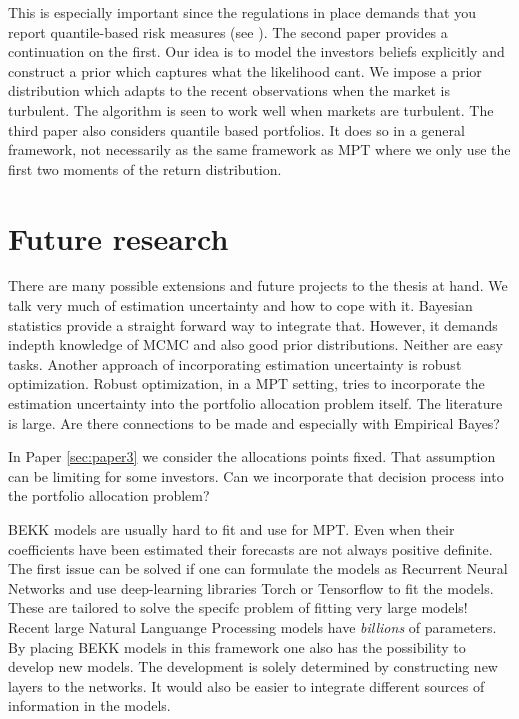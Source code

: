 \documentclass[oneside]{book}\usepackage{knitr}
\begin{document}
This is especially important since the regulations in place demands that you report quantile-based risk measures (see \citet{basel4}).
The second paper provides a continuation on the first. 
Our idea is to model the investors beliefs explicitly and construct a prior which captures what the likelihood cant. 
We impose a prior distribution which adapts to the recent observations when the market is turbulent. 
The algorithm is seen to work well when markets are turbulent.
The third paper also considers quantile based portfolios. 
It does so in a general framework, not necessarily as the same framework as MPT where we only use the first two moments of the return distribution.



\chapter{Future research}\label{ch:future}


There are many possible extensions and future projects to the thesis at hand. We talk very much of estimation uncertainty and how to cope with it.
Bayesian statistics provide a straight forward way to integrate that. 
However, it demands indepth knowledge of MCMC and also good prior distributions.
Neither are easy tasks.
Another approach of incorporating estimation uncertainty is robust optimization.
Robust optimization, in a MPT setting, tries to incorporate the estimation uncertainty into the portfolio allocation problem itself.
The literature is large. 
Are there connections to be made and especially with Empirical Bayes?

In Paper \ref{sec:paper3} we consider the allocations points fixed.
That assumption can be limiting for some investors. 
Can we incorporate that decision process into the portfolio allocation problem?

BEKK models are usually hard to fit and use for MPT. 
Even when their coefficients have been estimated their forecasts are not always positive definite. 
The first issue can be solved if one can formulate the models as Recurrent Neural Networks and use deep-learning libraries Torch or Tensorflow to fit the models. 
These are tailored to solve the specifc problem of fitting very large models! Recent large Natural Languange Processing models have \textit{billions} of parameters. 
By placing BEKK models in this framework one also has the possibility to develop new models. 
The development is solely determined by constructing new layers to the networks. 
It would also be easier to integrate different sources of information in the models.
\end{document}

